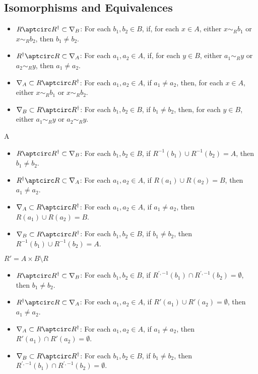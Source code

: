 \subsection{Isomorphisms and Equivalences}\label{subsection-isomorphisms-and-equivalences-in-rel-apartness}
\begin{itemize}
    \item $R\aptcirc R^{\dagger}\subset\nabla_{B}$:  For each $b_{1},b_{2}\in B$, if, for each $x\in A$, either $x\sim_{R}b_{1}$ or $x\sim_{R}b_{2}$, then $b_{1}\neq b_{2}$.
    \item $R^{\dagger}\aptcirc R\subset\nabla_{A}$:  For each $a_{1},a_{2}\in A$, if, for each $y\in B$, either $a_{1}\sim_{R}y$ or $a_{2}\sim_{R}y$, then $a_{1}\neq a_{2}$.
    \item $\nabla_{A}\subset R\aptcirc R^{\dagger}$: For each $a_{1},a_{2}\in A$, if $a_{1}\neq a_{2}$, then, for each $x\in A$, either $x\sim_{R}b_{1}$ or $x\sim_{R}b_{2}$.
    \item $\nabla_{B}\subset R\aptcirc R^{\dagger}$: For each $b_{1},b_{2}\in B$, if $b_{1}\neq b_{2}$, then, for each $y\in B$, either $a_{1}\sim_{R}y$ or $a_{2}\sim_{R}y$.
\end{itemize}
A
\begin{itemize}
    \item $R\aptcirc R^{\dagger}\subset\nabla_{B}$:  For each $b_{1},b_{2}\in B$, if $R^{-1}(b_{1})\cup R^{-1}(b_{2})=A$, then $b_{1}\neq b_{2}$.
    \item $R^{\dagger}\aptcirc R\subset\nabla_{A}$:  For each $a_{1},a_{2}\in A$, if $R(a_{1})\cup R(a_{2})=B$, then $a_{1}\neq a_{2}$.
    \item $\nabla_{A}\subset R\aptcirc R^{\dagger}$: For each $a_{1},a_{2}\in A$, if $a_{1}\neq a_{2}$, then $R(a_{1})\cup R(a_{2})=B$.
    \item $\nabla_{B}\subset R\aptcirc R^{\dagger}$: For each $b_{1},b_{2}\in B$, if $b_{1}\neq b_{2}$, then $R^{-1}(b_{1})\cup R^{-1}(b_{2})=A$.
\end{itemize}
$R'=A\times B\setminus R$
\begin{itemize}
    \item $R\aptcirc R^{\dagger}\subset\nabla_{B}$:  For each $b_{1},b_{2}\in B$, if $R^{\prime,-1}(b_{1})\cap R^{\prime,-1}(b_{2})=\emptyset$, then $b_{1}\neq b_{2}$.
    \item $R^{\dagger}\aptcirc R\subset\nabla_{A}$:  For each $a_{1},a_{2}\in A$, if $R'(a_{1})\cup R'(a_{2})=\emptyset$,                       then $a_{1}\neq a_{2}$.
    \item $\nabla_{A}\subset R\aptcirc R^{\dagger}$: For each $a_{1},a_{2}\in A$, if $a_{1}\neq a_{2}$,                                         then $R'(a_{1})\cap R'(a_{2})=\emptyset$.
    \item $\nabla_{B}\subset R\aptcirc R^{\dagger}$: For each $b_{1},b_{2}\in B$, if $b_{1}\neq b_{2}$,                                         then $R^{\prime,-1}(b_{1})\cap R^{\prime,-1}(b_{2})=\emptyset$.
\end{itemize}
